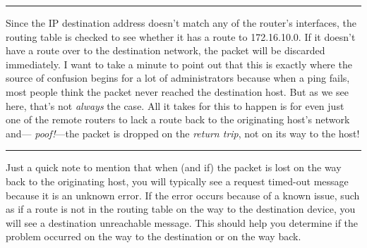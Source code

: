 \begin{enumerate}
  \begin{center}\rule{0.5\linewidth}{0.5pt}\end{center}

  Since the IP destination address doesn't match any of the router's
  interfaces, the routing table is checked to see whether it has a route
  to 172.16.10.0. If it doesn't have a route over to the destination
  network, the packet will be discarded immediately. I want to take a
  minute to point out that this is exactly where the source of confusion
  begins for a lot of administrators because when a ping fails, most
  people think the packet never reached the destination host. But as we
  see here, that's not \emph{always} the case. All it takes for this to
  happen is for even just one of the remote routers to lack a route back
  to the originating host's network and--- \emph{poof!}---the packet is
  dropped on the \emph{return trip}, not on its way to the host!

  \begin{center}\rule{0.5\linewidth}{0.5pt}\end{center}

  Just a quick note to mention that
  when (and if) the packet is lost on the way back to the originating
  host, you will typically see a request timed-out message because it is
  an unknown error. If the error occurs because of a known issue, such
  as if a route is not in the routing table on the way to the
  destination device, you will see a destination unreachable message.
  This should help you determine if the problem occurred on the way to
  the destination or on the way back.


\end{enumerate}

